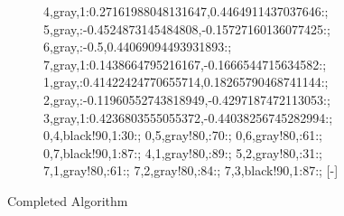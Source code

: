 \documentclass[\main/main.tex]{subfiles}
\begin{document}
\begin{figure}
\begin{subfigure}{0.25\textwidth}
{      4,gray,1:0.27161988048131647\textwidth,0.4464911437037646\textwidth:;
      5,gray,:-0.4524873145484808\textwidth,-0.15727160136077425\textwidth:;
      6,gray,:-0.5\textwidth,0.44069094493931893\textwidth:;
      7,gray,1:0.1438664795216167\textwidth,-0.1666544715634582\textwidth:;
      1,gray,:0.41422424770655714\textwidth,0.18265790468741144\textwidth:;
      2,gray,:-0.11960552743818949\textwidth,-0.4297187472113053\textwidth:;
      3,gray,1:0.4236803555055372\textwidth,-0.44038256745282994\textwidth:;
    }{
      0,4,black!90,1:30:;
      0,5,gray!80,:70:;
      0,6,gray!80,:61:;
      0,7,black!90,1:87:;
      4,1,gray!80,:89:;
      5,2,gray!80,:31:;
      7,1,gray!80,:61:;
      7,2,gray!80,:84:;
      7,3,black!90,1:87:;
    }[-]
    \myAdigraph{}

  \end{subfigure}
  \caption{Completed Algorithm}
\end{figure}


\clearpage
\end{document}
